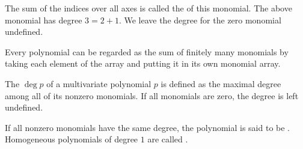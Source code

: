 \begin{definition}
  The sum of the indices over all axes is called the  of this monomial. The above monomial has degree \( 3 = 2 + 1 \). We leave the degree for the zero monomial undefined.

  Every polynomial can be regarded as the sum of finitely many monomials by taking each element of the array and putting it in its own monomial array.

  The  \( \deg p \) of a multivariate polynomial \( p \) is defined as the maximal degree among all of its nonzero monomials. If all monomials are zero, the degree is left undefined.

  If all nonzero monomials have the same degree, the polynomial is said to be . Homogeneous polynomials of degree \( 1 \) are called .
\end{definition}

